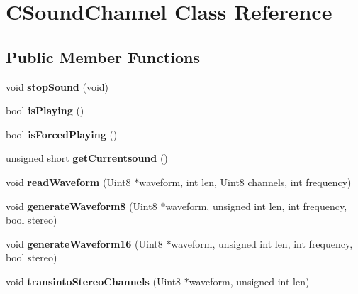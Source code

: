 \hypertarget{class_c_sound_channel}{
\section{CSoundChannel Class Reference}
\label{class_c_sound_channel}
}
\subsection*{Public Member Functions}
\begin{DoxyCompactItemize}
\item 
\hypertarget{class_c_sound_channel_a556b6c33fb04f6ea29348a5d5ae2836f}{
void {\bfseries stopSound} (void)}
\label{class_c_sound_channel_a556b6c33fb04f6ea29348a5d5ae2836f}

\item 
\hypertarget{class_c_sound_channel_a561a445f219f83de81ebf8bc3aede744}{
bool {\bfseries isPlaying} ()}
\label{class_c_sound_channel_a561a445f219f83de81ebf8bc3aede744}

\item 
\hypertarget{class_c_sound_channel_aa51ede263c1b8dfe0f947be0bc1f7b08}{
bool {\bfseries isForcedPlaying} ()}
\label{class_c_sound_channel_aa51ede263c1b8dfe0f947be0bc1f7b08}

\item 
\hypertarget{class_c_sound_channel_aebf76b5622594cb379ca571644122cd1}{
unsigned short {\bfseries getCurrentsound} ()}
\label{class_c_sound_channel_aebf76b5622594cb379ca571644122cd1}

\item 
\hypertarget{class_c_sound_channel_a2432d88f919e7ca35f26e4c1136739c6}{
void {\bfseries readWaveform} (Uint8 $\ast$waveform, int len, Uint8 channels, int frequency)}
\label{class_c_sound_channel_a2432d88f919e7ca35f26e4c1136739c6}

\item 
\hypertarget{class_c_sound_channel_a85a5ed9196edc23958ab8eb1b9739cb6}{
void {\bfseries generateWaveform8} (Uint8 $\ast$waveform, unsigned int len, int frequency, bool stereo)}
\label{class_c_sound_channel_a85a5ed9196edc23958ab8eb1b9739cb6}

\item 
\hypertarget{class_c_sound_channel_a61a0fa24ab873f6985633e54bca2946c}{
void {\bfseries generateWaveform16} (Uint8 $\ast$waveform, unsigned int len, int frequency, bool stereo)}
\label{class_c_sound_channel_a61a0fa24ab873f6985633e54bca2946c}

\item 
\hypertarget{class_c_sound_channel_acec131edc19ef3ea3b6ec37f5e062b85}{
void {\bfseries transintoStereoChannels} (Uint8 $\ast$waveform, unsigned int len)}
\label{class_c_sound_channel_acec131edc19ef3ea3b6ec37f5e062b85}


\end{DoxyCompactItemize}
